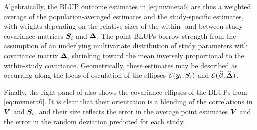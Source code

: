 Algebraically, the BLUP outcome estimates in \eqref{eq:mvmeta6}
are thus a weighted average of the population-averaged estimates and the study-specific estimates,
with weights depending on the relative sizes of the within- and between-study covariance matrices $\bm{S}_i$ and $\bm{\Delta}$.
The point BLUPs borrow strength from  the assumption of an underlying multivariate distribution of study parameters with covariance matrix $\bm{\Delta}$, shrinking toward the mean inversely proportional to the within-study covariance.
Geometrically, these estimates may be described as occurring along the locus of osculation of the ellipses
$\mathcal{E}(\bm{y}_i, \bm{S}_i)$ and $\mathcal{E}(\widehat{\bm{\beta}}, \widehat{\bm{\Delta}})$.

Finally, the right panel of  also shows the covariance ellipses of the BLUPs
from \eqref{eq:mvmeta6}. It is clear that their orientation is a blending of the correlations in
$\bm{V}$ and $\bm{S}_i$, and their size reflects the error in the average point estimates $\bm{V}$
and the error in the random deviation predicted for each study.
